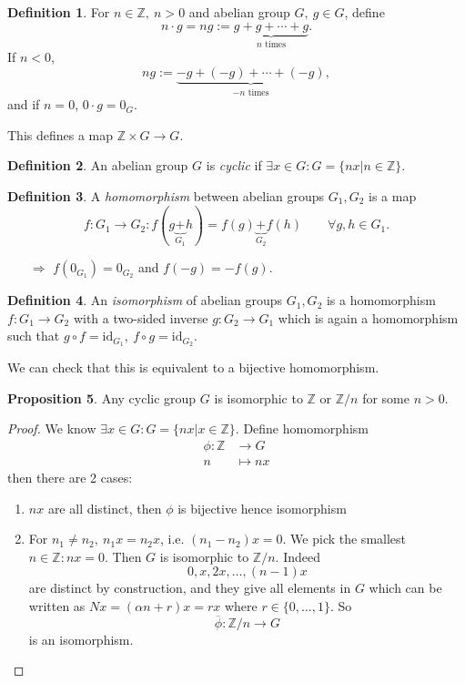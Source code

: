 \documentclass[a4paper]{article}
\newcommand{\id}{\text{id}}
\theoremstyle{definition}
\newtheorem{defn}{Definition}[subsection]
\newtheorem{prop}[defn]{Proposition}
\begin{document}
\begin{defn}
For $n\in \mathbb Z,\ n>0$ and abelian group $G,\ g\in G$, define
\[
n\cdot g = ng := \underbrace{g+g+\cdots+g}_{n\text{ times}} .
\]
If $n<0$,
\[
ng := \underbrace{-g+(-g)+\cdots+(-g)}_{-n\text{ times}} ,
\]
and if $n=0$, $0\cdot g = 0_G.$
\end{defn}
This defines a map $\mathbb Z \times G \rightarrow G.$
\begin{defn}
An abelian group $G$ is \textit{cyclic} if $\exists x\in G:G=\{nx | n\in \mathbb Z\} .$
\end{defn}
\begin{defn}
A \textit{homomorphism} between abelian groups $G_1,G_2$ is a map
\[
f:G_1\rightarrow G_2:f(g\underbrace{+}_{G_1}h)=f(g)\underbrace{+}_{G_2}f(h) \qquad \forall g,h\in G_1 .
\]
\begin{itemize}
    \item[$\Rightarrow$] $f\left(0_{G_1}\right)=0_{G_2}$ and $f(-g) = -f(g).$
\end{itemize}
\end{defn}
\begin{defn}
An \textit{isomorphism} of abelian groups $G_1,G_2$ is a homomorphism $f:G_1\rightarrow G_2$ with a two-sided inverse $g:G_2\rightarrow G_1$ which is again a homomorphism such that $g\circ f = \id_{G_1},\ f\circ g = \id_{G_2}$.
\end{defn}
We can check that this is equivalent to a bijective homomorphism.
\begin{prop}
Any cyclic group $G$ is isomorphic to $\mathbb Z$ or $\mathbb Z/n$ for some $n>0.$
\end{prop}
\begin{proof}
We know $\exists x\in G : G=\{n x|x\in \mathbb Z\}$. Define homomorphism
\[
\begin{aligned}
\phi:\mathbb Z &\rightarrow G \\
n &\mapsto nx
\end{aligned}
\]
then there are 2 cases:
\begin{enumerate}
    \item $nx$ are all distinct, then $\phi$ is bijective hence isomorphism
    \item For $n_1\neq n_2,\ n_1 x=n_2 x$, i.e. $(n_1-n_2)x=0$. We pick the smallest $n\in \mathbb Z:n x=0.$ Then $G$ is isomorphic to $\mathbb Z/n$. Indeed
    \[
    0,x,2x,\ldots,(n-1)x
    \]
    are distinct by construction, and they give all elements in $G$ which can be written as $Nx=(\alpha n+r)x=rx$ where $r\in \{0,\ldots,1\}.$ So
    \[
    \overline{\phi}:\mathbb Z/n \rightarrow G
    \]
    is an isomorphism.
\end{enumerate}
\end{proof}
\end{document}
